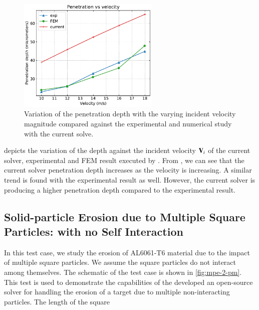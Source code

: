 \begin{figure}[!htpb]
  \centering
  \includegraphics[width=0.6\textwidth]{figures/erosion/figures/cao_xuerui_2022_spherical_particle_impact_3d/penetration_vs_velocity}
  \caption{Variation of the penetration depth with the varying incident velocity
    magnitude compared against the experimental and numerical study with the
    current solve.}
  \label{fig:results-sphere-target-impact-vel-vs-depth}
\end{figure}
 depicts the variation of
the depth against the incident velocity $\mathbf{V}_i$ of the current solver,
experimental and FEM result executed by \cite{zang2022investigation}. From
, we can see that the
current solver penetration depth increases as the velocity is increasing. A
similar trend is found with the experimental result as well. However, the
current solver is producing a higher penetration depth compared to the
experimental result.

\subsection{Solid-particle Erosion due to Multiple Square Particles: with no Self
  Interaction}
\label{sec:res:mpe-2}
In this test case, we study the erosion of AL6061-T6 material due to the
impact of multiple square particles. We assume the square particles do not
interact among themselves. The schematic of the test case is shown in
\cref{fig:mpe-2-pm}. This test is used to demonstrate the capabilities of the
developed an open-source solver for handling the erosion of a target due to multiple
non-interacting particles. The length of the square

